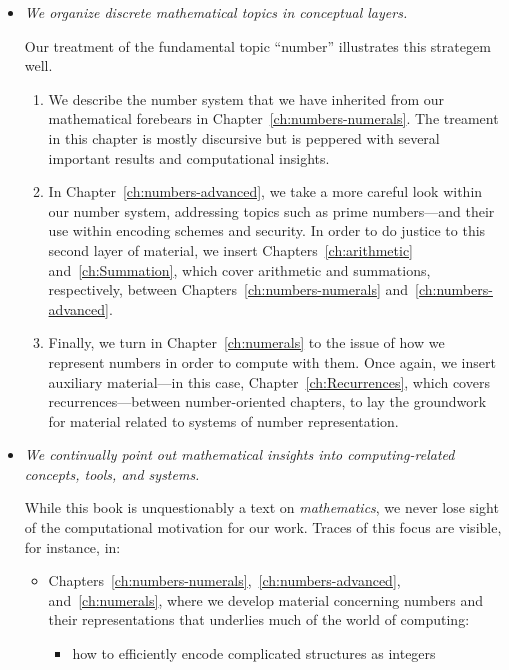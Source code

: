 \begin{itemize}
\item
{\em We organize discrete mathematical topics in conceptual layers.}

Our treatment of the fundamental topic ``number'' illustrates this
strategem well.
  \begin{enumerate}
  \item
We describe the number system that we have inherited from our
mathematical forebears in Chapter~\ref{ch:numbers-numerals}.  The
treament in this chapter is mostly discursive but is peppered with
several important results and computational insights.
  \item
In Chapter~\ref{ch:numbers-advanced}, we take a more careful look
within our number system, addressing topics such as prime
numbers---and their use within encoding schemes and security.  In
order to do justice to this second layer of material, we insert
Chapters~\ref{ch:arithmetic} and~\ref{ch:Summation}, which cover
arithmetic and summations, respectively, between
Chapters~\ref{ch:numbers-numerals} and~\ref{ch:numbers-advanced}.
  \item
Finally, we turn in Chapter~\ref{ch:numerals} to the issue of how we
represent numbers in order to compute with them.  Once again, we
insert auxiliary material---in this case,
Chapter~\ref{ch:Recurrences}, which covers recurrences---between
number-oriented chapters, to lay the groundwork for material related
to systems of number representation.
  \end{enumerate}

\item
{\em We continually point out mathematical insights into
 {\em computing-related} concepts, tools, and systems.}

While this book is unquestionably a text on {\em mathematics}, we
never lose sight of the computational motivation for our work.  Traces
of this focus are visible, for instance, in:
  \begin{itemize}
  \item
Chapters~\ref{ch:numbers-numerals},~\ref{ch:numbers-advanced},
and~\ref{ch:numerals}, where we develop material concerning numbers
and their representations that underlies much of the world of
computing:
     \begin{itemize}
     \item
how to efficiently encode complicated structures as integers


\end{itemize}
\end{itemize}
\end{itemize}
